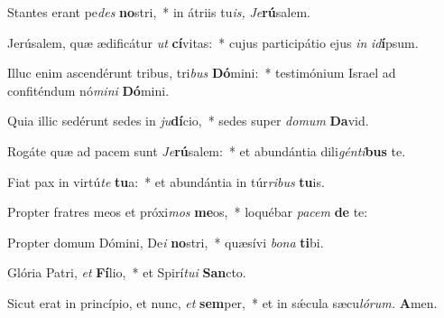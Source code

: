 \item Stantes erant pe\hspace{0.02em}\textit{des} \textbf{no}stri,~* in átriis tu\textit{is,}\hspace{0.02em} \textit{Je}\textbf{rú}salem.
\item Jerúsalem, quæ ædificátur \textit{ut} \textbf{cí}vitas:~* cujus participátio ejus \textit{in} \textit{id}\textbf{í}psum.
\item Illuc enim ascendérunt tribus, tri\textit{bus} \textbf{Dó}mini:~* testimónium Israel ad confiténdum nó\textit{mini} \textbf{Dó}mini.
\item Quia illic sedérunt sedes in \textit{ju}\textbf{dí}cio,~* sedes super \textit{domum} \textbf{Da}vid.
\item Rogáte quæ ad pacem sunt\hspace{0.02em} \textit{Je}\textbf{rú}salem:~* et abundántia dili\textit{génti}\textbf{bus} te.
\item Fiat pax in virtú\textit{te} \textbf{tu}a:~* et abundántia in túr\textit{ribus} \textbf{tu}is.
\item Propter fratres meos et próxi\textit{mos} \textbf{me}os,~* loquébar \textit{pacem} \textbf{de} te:
\item Propter domum Dómini, De\textit{i} \textbf{no}stri,~* quæsívi \textit{bona} \textbf{ti}bi.
\item Glória Patri, \textit{et} \textbf{Fí}lio,~* et Spirí\hspace{0.03em}\textit{tui} \textbf{San}cto.
\item Sicut erat in princípio, et nunc, \textit{et} \textbf{sem}per,~* et in sǽcula sæcu\hspace{0.03em}\textit{lórum.} \textbf{A}men.